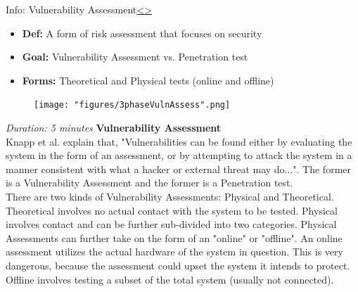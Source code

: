 \documentclass[12pt]{extarticle}
\newenvironment{instructionblock}{\Large\bgroup}{\egroup}
\newcommand{\bi}{\begin{itemize}}
\newcommand{\ei}{\end{itemize}}
\newcounter{next}
\newcounter{prev}
\begin{document}
\pagebreak
{}
\begin{slide}{Info: Vulnerability Assessment}{\hyperref[slide \theprev]{\textless}\hyperref[slide \thenext]{\textgreater}}
	\begin{instructionblock}
		\bi
			\item[]\textbf{Def:} A form of risk assessment that focuses on security
			\item[]\textbf{Goal:} Vulnerability Assessment vs. Penetration test
			\item[]\textbf{Forms:} Theoretical and Physical tests (online and offline)
		\ei
		\begin{figure}[H]
			\centering
			\texttt{[image: "figures/3phaseVulnAssess".png]}
		\end{figure}
	\end{instructionblock}
\end{slide}
\textit{Duration: 5 minutes}
\vfill
\noindent
\textbf{Vulnerability Assessment}\\
Knapp et al. explain that, "Vulnerabilities can be found either by evaluating the system in the form of an assessment, or by attempting to attack the system in a manner consistent with what a hacker or external threat may do..."\cite{KnappLangill}. The former is a Vulnerability Assessment and the former is a Penetration test.\\
There are two kinds of Vulnerability Assessments: Physical and Theoretical. Theoretical involves no actual contact with the system to be tested. Physical involves contact and can be further sub-divided into two categories. Physical Assessments can further take on the form of an "online" or "offline". An online assessment utilizes the actual hardware of the system in question. This is very dangerous, because the assessment could upset the system it intends to protect. Offline involves testing a subset of the total system (usually not connected).\cite{KnappLangill}
\pagebreak

\end{document}
